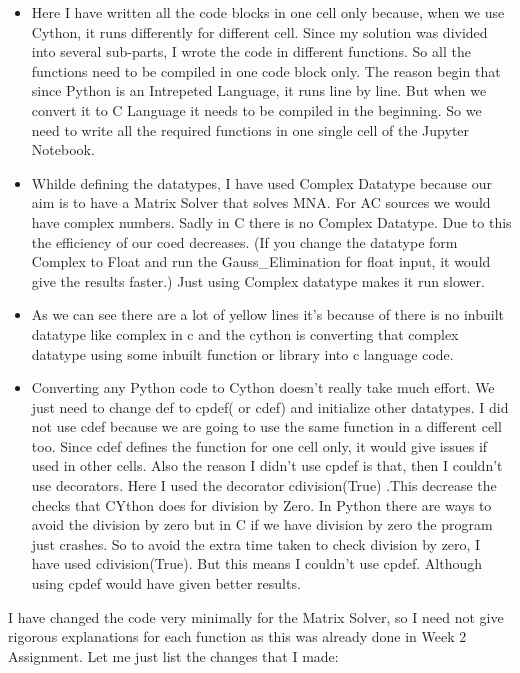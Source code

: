 \documentclass[11pt]{article}
\begin{document}
\begin{itemize}
\item
  Here I have written all the code blocks in one cell only because, when
  we use Cython, it runs differently for different cell. Since my
  solution was divided into several sub-parts, I wrote the code in
  different functions. So all the functions need to be compiled in one
  code block only. The reason begin that since Python is an Intrepeted
  Language, it runs line by line. But when we convert it to C Language
  it needs to be compiled in the beginning. So we need to write all the
  required functions in one single cell of the Jupyter Notebook.
\item
  Whilde defining the datatypes, I have used Complex Datatype because
  our aim is to have a Matrix Solver that solves MNA. For AC sources we
  would have complex numbers. Sadly in C there is no Complex Datatype.
  Due to this the efficiency of our coed decreases. (If you change the
  datatype form Complex to Float and run the Gauss\_Elimination for
  float input, it would give the results faster.) Just using Complex
  datatype makes it run slower.
\item
  As we can see there are a lot of yellow lines it's because of there is
  no inbuilt datatype like complex in c and the cython is converting
  that complex datatype using some inbuilt function or library into c
  language code.
\item
  Converting any Python code to Cython doesn't really take much effort.
  We just need to change def to cpdef( or cdef) and initialize other
  datatypes. I did not use cdef because we are going to use the same
  function in a different cell too. Since cdef defines the function for
  one cell only, it would give issues if used in other cells. Also the
  reason I didn't use cpdef is that, then I couldn't use decorators.
  Here I used the decorator cdivision(True) .This decrease the checks
  that CYthon does for division by Zero. In Python there are ways to
  avoid the division by zero but in C if we have division by zero the
  program just crashes. So to avoid the extra time taken to check
  division by zero, I have used cdivision(True). But this means I
  couldn't use cpdef. Although using cpdef would have given better
  results.
\end{itemize}

I have changed the code very minimally for the Matrix Solver, so I need
not give rigorous explanations for each function as this was already
done in Week 2 Assignment. Let me just list the changes that I made:
\end{document}
